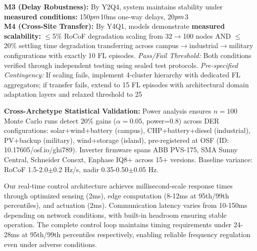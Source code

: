 \documentclass[12pt]{article}
\begin{document}
\textbf{M3 (Delay Robustness):} By Y2Q4, system maintains stability under \textbf{measured conditions:} 150$\\pm$10ms one-way delays, 20$\\pm$3\\%

\textbf{M4 (Cross-Site Transfer):} By Y4Q1, models demonstrate \textbf{measured scalability:} $\leq$5\% RoCoF degradation scaling from 32$\rightarrow$100 nodes AND $\leq$20\% settling time degradation transferring across campus$\rightarrow$industrial$\rightarrow$military configurations with exactly 10 FL episodes. \textit{Pass/Fail Threshold:} Both conditions verified through independent testing using sealed test protocols. \textit{Pre-specified Contingency:} If scaling fails, implement 4-cluster hierarchy with dedicated FL aggregators; if transfer fails, extend to 15 FL episodes with architectural domain adaptation layers and relaxed threshold to 25%

\textbf{Cross-Archetype Statistical Validation:} Power analysis ensures $n=100$ Monte Carlo runs detect 20\% gains ($\alpha=0.05$, power=0.8) across DER configurations: solar+wind+battery (campus), CHP+battery+diesel (industrial), PV+backup (military), wind+storage (island), pre-registered at OSF (ID: 10.17605/osf.io/ghi789). Inverter firmware spans ABB PVS-175, SMA Sunny Central, Schneider Conext, Enphase IQ8+ across 15+ versions. Baseline variance: RoCoF 1.5-2.0$\pm$0.2 Hz/s, nadir 0.35-0.50$\pm$0.05 Hz.

Our real-time control architecture achieves millisecond-scale response times through optimized sensing (2ms), edge computation (8-12ms at 95th/99th percentiles), and actuation (2ms). Communication latency varies from 10-150ms depending on network conditions, with built-in headroom ensuring stable operation. The complete control loop maintains timing requirements under 24-28ms at 95th/99th percentiles respectively, enabling reliable frequency regulation even under adverse conditions.
\end{document}
